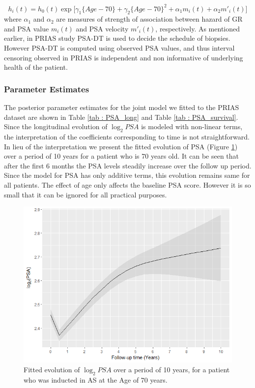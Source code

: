 \begin{equation}
\label{eq : hazard_prias}
h_i(t) = h_0(t) \exp\big[\gamma_1 \{Age-70\}  + \gamma_2 \{Age-70\}^2 + \alpha_1 m_i(t) + \alpha_2 m'_i(t)\big]
\end{equation}
where $\alpha_1$ and $\alpha_2$ are measures of strength of association between hazard of GR and PSA value $m_i(t)$ and PSA velocity $m'_i(t)$, respectively. As mentioned earlier, in PRIAS study PSA-DT is used to decide the schedule of biopsies. However PSA-DT is computed using observed PSA values, and thus interval censoring observed in PRIAS is independent and non informative of underlying health of the patient.

\subsubsection{Parameter Estimates}
\label{subsec : param_estimates_jm_fit_prias}
The posterior parameter estimates for the joint model we fitted to the PRIAS dataset are shown in Table \ref{tab : PSA_long} and Table \ref{tab : PSA_survival}. Since the longitudinal evolution of $\log_2 PSA$ is modeled with non-linear terms, the interpretation of the coefficients corresponding to time is not straightforward. In lieu of the interpretation we present the fitted evolution of PSA (Figure \ref{fig : fitted_trend_psa}) over a period of 10 years for a patient who is 70 years old. It can be seen that after the first 6 months the PSA levels steadily increase over the follow up period. Since the model for PSA has only additive terms, this evolution remains same for all patients. The effect of age only affects the baseline PSA score. However it is so small that it can be ignored for all practical purposes.

\begin{figure}
\centerline{\includegraphics[width=\columnwidth]{images/fitted_trend_psa.png}}
\caption{Fitted evolution of $\log_2 PSA$ over a period of 10 years, for a patient who was inducted in AS at the Age of 70 years.}
\label{fig : fitted_trend_psa}
\end{figure}

